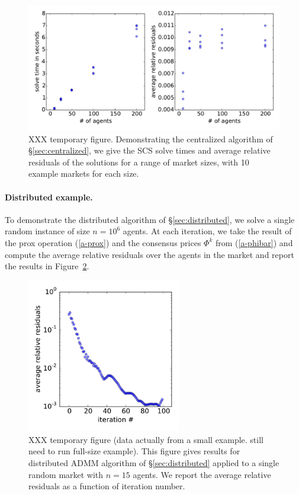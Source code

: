\documentclass[12pt]{article}
\begin{document}
\begin{figure}
\begin{center}
\includegraphics[width=1.0\textwidth]{figures/cvxpy}
\end{center}
\caption{XXX temporary figure.
Demonstrating the centralized algorithm of \S\ref{sec:centralized}, we give the
SCS solve times and average relative residuals of the solutions for a range of
market sizes, with 10 example markets for each size.
}
\label{f-cvxpy}
\end{figure}


\paragraph{Distributed example.}
\label{sec:distributed_examples}
To demonstrate the distributed algorithm of \S\ref{sec:distributed},
we solve a single random instance of size $n=10^6$ agents. At each iteration,
we take the result of the prox operation (\ref{a-prox}) and the consensus
prices $\Phi^k$ from (\ref{a-phibar}) and compute the average
relative residuals over the agents in the market and report the results in
Figure~\ref{f-admm}.

\begin{figure}
\begin{center}
\includegraphics[width=0.6\textwidth]{figures/admm}
\end{center}
\caption{XXX temporary figure (data actually from a small example. still need
to run full-size example). This figure gives results for distributed ADMM
algorithm of \S\ref{sec:distributed} applied to a single random market
with $n=15$ agents. We report the average relative residuals as a function
of iteration number.}
\label{f-admm}
\end{figure}
\end{document}
